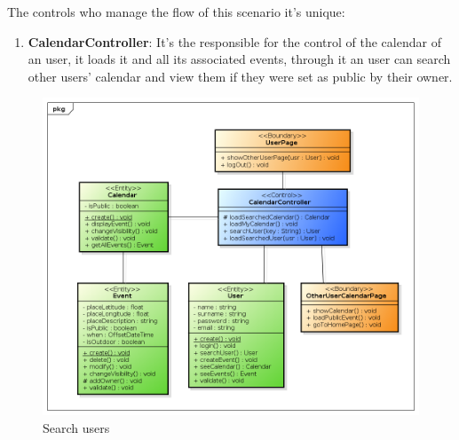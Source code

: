 The controls who manage the flow of this scenario it's unique:\begin{enumerate}
\item {\bf CalendarController}: It's the responsible for the control of the calendar of an user, it loads it and all its associated events, through it an user can search other users' calendar and view them if they were set as public by their owner.

\end{enumerate}
\begin{center}
 \begin{figure}[H]
    \includegraphics[width=1\textwidth]{./BCEDiagram/BCE/EntityOverview/SearchUserBCE.png}
    \caption{Search users}
     \label{fig:searchBCE}
     \end{figure}
   \end{center} 
  
  
